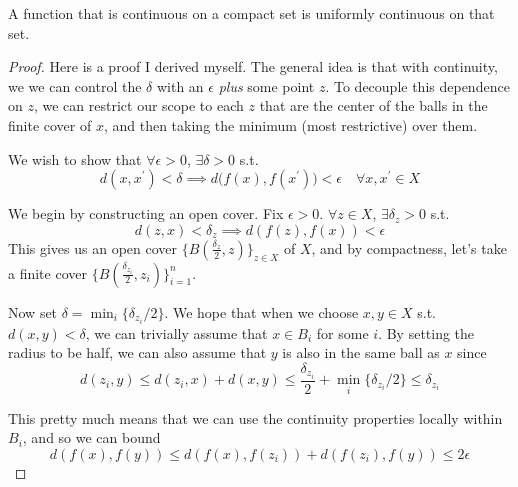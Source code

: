   \begin{theorem}
    A function that is continuous on a compact set is uniformly continuous on that set. 
  \end{theorem}
  \begin{proof}
    Here is a proof I derived myself. The general idea is that with continuity, we we can control the $\delta$ with an $\epsilon$ \textit{plus} some point $z$. To decouple this dependence on $z$, we can restrict our scope to each $z$ that are the center of the balls in the finite cover of $x$, and then taking the minimum (most restrictive) over them. 

    We wish to show that $\forall \epsilon > 0$, $\exists \delta > 0$ s.t. 
    \begin{equation}
      d(x, x^\prime) < \delta \implies d\big( f(x), f(x^\prime) \big) < \epsilon \quad \forall x, x^\prime \in X
    \end{equation} 

    We begin by constructing an open cover. Fix $\epsilon > 0$. $\forall z \in X$, $\exists \delta_z > 0$ s.t. 
    \begin{equation}
      d(z, x) < \delta_z \implies d(f(z), f(x)) < \epsilon
    \end{equation}
    This gives us an open cover $\{B(\frac{\delta_z}{2}, z)\}_{z \in X}$ of $X$, and by compactness, let's take a finite cover $\{B(\frac{\delta_{z_i}}{2}, z_i)\}_{i=1}^n$. 

    Now set $\delta = \min_i \{\delta_{z_i}/2\}$. We hope that when we choose $x, y \in X$ s.t. $d(x, y) < \delta$, we can trivially assume that $x \in B_i$ for some $i$. By setting the radius to be half, we can also assume that $y$ is also in the same ball as $x$ since 
    \begin{equation}
      d(z_i, y) \leq d(z_i, x) + d(x, y) \leq \frac{\delta_{z_i}}{2} + \min_i \{\delta_{z_i}/2\} \leq \delta_{z_i}
    \end{equation} 

    This pretty much means that we can use the continuity properties locally within $B_i$, and so we can bound
    \begin{equation}
      d(f(x), f(y)) \leq d(f(x), f(z_i)) + d(f(z_i), f(y)) \leq 2 \epsilon
    \end{equation}
  \end{proof}
